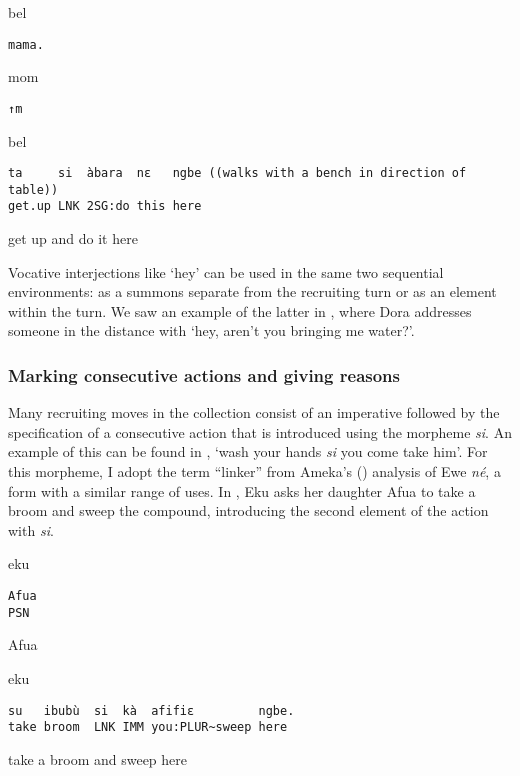 \documentclass[output=paper]{langsci/langscibook}
\begin{document}
\vspace{2mm}
%
\begin{transbox}{1}{bel}
\begin{verbatim}
mama.
\end{verbatim}
\end{transbox}
%
\begin{transbox}{2}{mom}
\begin{verbatim}
↑m
\end{verbatim}
\end{transbox}
%
\begin{transbox}{3}{bel}
\begin{verbatim}
ta     si  àbara  nɛ   ngbe ((walks with a bench in direction of table))
get.up LNK 2SG:do this here
\end{verbatim}
get up and do it here
\end{transbox}
%
\bigskip

\normalsize
Vocative interjections like ‘hey’ can be used in the same two sequential environments: as a summons separate from the recruiting turn or as an element within the turn. We saw an example of the latter in , where Dora addresses someone in the distance with ‘hey, aren’t you bringing me water?’.

\subsubsection{Marking consecutive actions and giving reasons}\label{sec:dingemanse:3.3.2}

Many recruiting moves in the collection consist of an imperative followed by the specification of a consecutive action that is introduced using the morpheme \textit{si}. An example of this can be found in , ‘wash your hands \textit{si} you come take him’. For this morpheme, I adopt the term “linker” from Ameka's (\citeyear{ameka_aspect_2008}) analysis of Ewe \textit{né}, a form with a similar range of uses. In , Eku asks her daughter Afua to take a broom and sweep the compound, introducing the second element of the action with \textit{si}.

\vspace{2mm}
%
\begin{transbox}{1}{eku}
\begin{verbatim}
Afua
PSN
\end{verbatim}
Afua
\end{transbox}
%
%
\begin{mdframednoverticalspace}[style=firstfoc]
\begin{transbox}{3}{eku}
\begin{verbatim}
su   ibubù  si  kà  afifiɛ         ngbe.
take broom  LNK IMM you:PLUR~sweep here
\end{verbatim}
take a broom and sweep here
\end{transbox}
\end{mdframednoverticalspace}
%
\\
\end{document}

